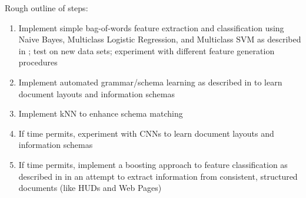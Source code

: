 \documentclass[twoside,11pt]{article}
\renewcommand{\>}{{\rightarrow}}
\newcommand{\1}{{\mathbf 1}}
\newcommand{\0}{{\mathbf 0}}
\begin{document}
Rough outline of steps:

\begin{enumerate}
    \item
    Implement simple bag-of-words feature extraction and classification using Naive Bayes, Multiclass Logistic Regression, and Multiclass SVM as described in \cite{LiuWanZhang2016}; test on new data sets; experiment with different feature generation procedures

    \item
    Implement automated grammar/schema learning as described in \cite{Dejean2015} to learn document layouts and information schemas

    \item
    Implement kNN to enhance schema matching

    \item
    If time permits, experiment with CNNs to learn document layouts and information schemas

    \item
    If time permits, implement a boosting approach to feature classification as described in \cite{Ives2003} in an attempt to extract information from consistent, structured documents (like HUDs and Web Pages)

\end{enumerate}







\end{document}
